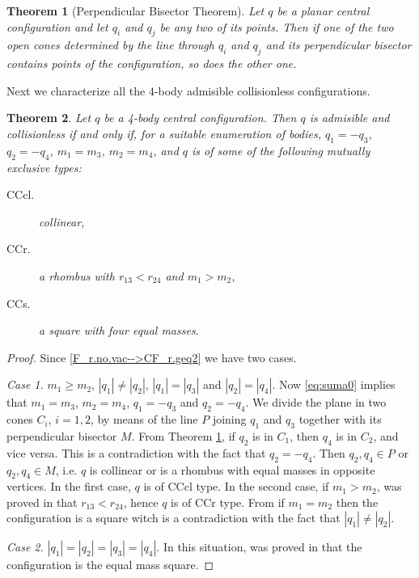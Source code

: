 \documentclass[twoside]{article}
\newtheorem{thm}{Theorem}[section]
\theoremstyle{remark}
\begin{document}
\begin{thm}[Perpendicular Bisector Theorem]\label{thm:bisector.moeckel}
Let $q$ be a planar central configuration and let
$q_i$ and $q_j$ be any two of its points. Then if one of the two open cones determined
by the line through $q_i$ and $q_j$ and its perpendicular bisector contains points of
the configuration, so does the other one.
\end{thm}

Next we characterize all the $4$-body admisible collisionless configurations.

\begin{thm}\label{thm:caracterizacion4}
Let $q$ be a 4-body central configuration. Then $q$ is  admisible and collisionless if and only if,  for a suitable enumeration  of bodies,   $q_1=-q_3$, $q_2=-q_4$, $m_1=m_3$,  $m_2=m_4$, and  $q$ is of some of the following mutually exclusive types:
\begin{description}
\item[CCcl.]   collinear,
\item[CCr.]  a rhombus with $r_{13}<r_{24}$ and $m_1>m_2$,
\item[CCs.]  a square with four equal masses.
\end{description}
\end{thm}







\begin{proof}
Since \eqref{F_r.no.vac-->CF_r.geq2} we have two cases.

\emph{Case 1.}  $m_1\geq m_2$, $|q_1|\neq|q_2|$, $|q_1|=|q_3|$ and $|q_2|=|q_4|$. Now \eqref{eq:suma0} implies that
 $m_1=m_3$, $m_2=m_4$, $q_1=-q_3$ and $q_2=-q_4$.  We divide the plane in two cones $C_i$, $i=1,2$, by means of  the line $P$ joining $q_1$  and $q_3$ together with its perpendicular bisector $M$.  From Theorem \ref{thm:bisector.moeckel}, if  $q_2$  is in $C_1$, then  $q_4$ is in $C_2$, and vice versa. This is a contradiction with the fact that $q_2=-q_4$. Then $q_2,q_4\in P$ or $q_2,q_4\in M$, i.e. $q$ is collinear or is a rhombus with equal masses in opposite vertices. In the first case, $q$ is of  CCcl type. In the second case, if $m_1>m_2$,   was proved in \cite[Eqs. $(3.44)$ and $(3.45)$]{long2002four} that $r_{13}<r_{24}$, hence $q$ is of  CCr type. From \cite[Corollary 2]{perez2007convex} if $m_1=m_2$ then the configuration is a square witch is a contradiction with the fact that $|q_1|\neq|q_2|$.

\emph{Case 2.} $|q_1|=|q_2|=|q_3|=|q_4|$. In this situation,  was proved in \cite{hampton2005co} that the configuration is the equal mass square.
\end{proof}
\end{document}
